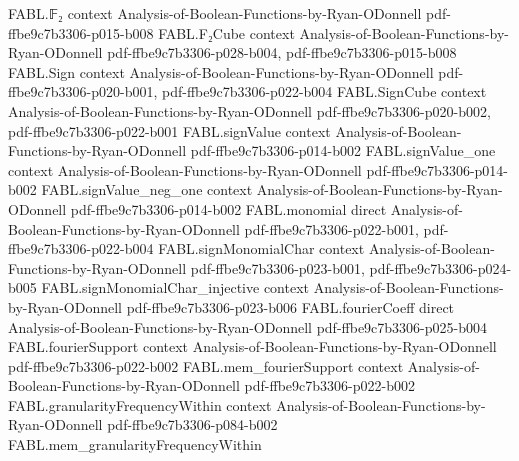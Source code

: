 \begin{theorem}
\label{FABL.oddWeightPartialSumPCPPSystem_accepts_iff}
\leanok
{}
\proofstep
  {FABL.𝔽₂}
  {context}
  {Analysis-of-Boolean-Functions-by-Ryan-ODonnell}
  {pdf-ffbe9c7b3306-p015-b008}
\proofstep
  {FABL.F₂Cube}
  {context}
  {Analysis-of-Boolean-Functions-by-Ryan-ODonnell}
  {pdf-ffbe9c7b3306-p028-b004,
    pdf-ffbe9c7b3306-p015-b008}
\proofstep
  {FABL.Sign}
  {context}
  {Analysis-of-Boolean-Functions-by-Ryan-ODonnell}
  {pdf-ffbe9c7b3306-p020-b001,
    pdf-ffbe9c7b3306-p022-b004}
\proofstep
  {FABL.SignCube}
  {context}
  {Analysis-of-Boolean-Functions-by-Ryan-ODonnell}
  {pdf-ffbe9c7b3306-p020-b002,
    pdf-ffbe9c7b3306-p022-b001}
\proofstep
  {FABL.signValue}
  {context}
  {Analysis-of-Boolean-Functions-by-Ryan-ODonnell}
  {pdf-ffbe9c7b3306-p014-b002}
\proofstep
  {FABL.signValue_one}
  {context}
  {Analysis-of-Boolean-Functions-by-Ryan-ODonnell}
  {pdf-ffbe9c7b3306-p014-b002}
\proofstep
  {FABL.signValue_neg_one}
  {context}
  {Analysis-of-Boolean-Functions-by-Ryan-ODonnell}
  {pdf-ffbe9c7b3306-p014-b002}
\proofstep
  {FABL.monomial}
  {direct}
  {Analysis-of-Boolean-Functions-by-Ryan-ODonnell}
  {pdf-ffbe9c7b3306-p022-b001,
    pdf-ffbe9c7b3306-p022-b004}
\proofstep
  {FABL.signMonomialChar}
  {context}
  {Analysis-of-Boolean-Functions-by-Ryan-ODonnell}
  {pdf-ffbe9c7b3306-p023-b001,
    pdf-ffbe9c7b3306-p024-b005}
\proofstep
  {FABL.signMonomialChar_injective}
  {context}
  {Analysis-of-Boolean-Functions-by-Ryan-ODonnell}
  {pdf-ffbe9c7b3306-p023-b006}
\proofstep
  {FABL.fourierCoeff}
  {direct}
  {Analysis-of-Boolean-Functions-by-Ryan-ODonnell}
  {pdf-ffbe9c7b3306-p025-b004}
\proofstep
  {FABL.fourierSupport}
  {context}
  {Analysis-of-Boolean-Functions-by-Ryan-ODonnell}
  {pdf-ffbe9c7b3306-p022-b002}
\proofstep
  {FABL.mem_fourierSupport}
  {context}
  {Analysis-of-Boolean-Functions-by-Ryan-ODonnell}
  {pdf-ffbe9c7b3306-p022-b002}
\proofstep
  {FABL.granularityFrequencyWithin}
  {context}
  {Analysis-of-Boolean-Functions-by-Ryan-ODonnell}
  {pdf-ffbe9c7b3306-p084-b002}
\proofstep
  {FABL.mem_granularityFrequencyWithin}

\end{theorem}
